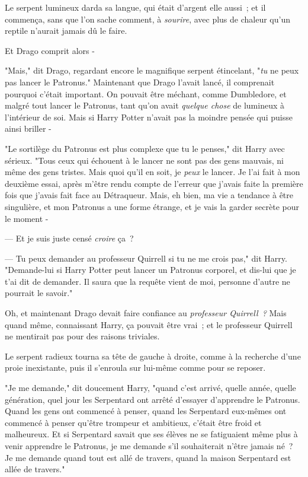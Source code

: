Le serpent lumineux darda sa langue, qui était d'argent elle aussi~; et il commença, sans que l'on sache comment, à \emph{sourire}, avec plus de chaleur qu'un reptile n'aurait jamais dû le faire.

Et Drago comprit alors -

"Mais," dit Drago, regardant encore le magnifique serpent étincelant, "\emph{tu} ne peux pas lancer le Patronus." Maintenant que Drago l'avait lancé, il comprenait pourquoi c'était important. On pouvait être méchant, comme Dumbledore, et malgré tout lancer le Patronus, tant qu'on avait \emph{quelque chose} de lumineux à l'intérieur de soi. Mais si Harry Potter n'avait pas la moindre pensée qui puisse ainsi briller -

"Le sortilège du Patronus est plus complexe que tu le penses," dit Harry avec sérieux. "Tous ceux qui échouent à le lancer ne sont pas des gens mauvais, ni même des gens tristes. Mais quoi qu'il en soit, je \emph{peux} le lancer. Je l'ai fait à mon deuxième essai, après m'être rendu compte de l'erreur que j'avais faite la première fois que j'avais fait face au Détraqueur. Mais, eh bien, ma vie a tendance à être singulière, et mon Patronus a une forme étrange, et je vais la garder secrète pour le moment -

--- Et je suis juste censé \emph{croire} ça~?

--- Tu peux demander au professeur Quirrell si tu ne me crois pas," dit Harry. "Demande-lui si Harry Potter peut lancer un Patronus corporel, et dis-lui que je t'ai dit de demander. Il saura que la requête vient de moi, personne d'autre ne pourrait le savoir."

Oh, et maintenant Drago devait faire confiance au \emph{professeur Quirrell~?} Mais quand même, connaissant Harry, ça pouvait être vrai~; et le professeur Quirrell ne mentirait pas pour des raisons triviales.

Le serpent radieux tourna sa tête de gauche à droite, comme à la recherche d'une proie inexistante, puis il s'enroula sur lui-même comme pour se reposer.

"Je me demande," dit doucement Harry, "quand c'est arrivé, quelle année, quelle génération, quel jour les Serpentard ont arrêté d'essayer d'apprendre le Patronus. Quand les gens ont commencé à penser, quand les Serpentard eux-mêmes ont commencé à penser qu'être trompeur et ambitieux, c'était être froid et malheureux. Et si Serpentard savait que ses élèves ne se fatiguaient même plus à venir apprendre le Patronus, je me demande s'il souhaiterait n'être jamais né~? Je me demande quand tout est allé de travers, quand la maison Serpentard est allée de travers."


